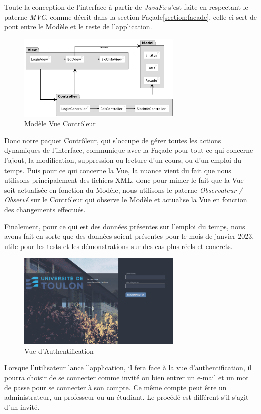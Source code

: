 \documentclass[a4paper,french,final]{memoir}
\begin{document}
Toute la conception de l'interface à partir de \emph{JavaFx} s'est faite en respectant le paterne \emph{MVC}, comme décrit dans la section Façade\ref{section:facade}, celle-ci sert de pont entre le Modèle et le reste de l'application.
\begin{figure}[!h]
    \centering
    \includegraphics[width=0.7\textwidth]{figures/mvc_pattern.png}
    \caption{Modèle Vue Contrôleur}
    \label{fig:mvc_pattern}
\end{figure}
Donc notre paquet Contrôleur, qui s'occupe de gérer toutes les actions dynamiques de l'interface, communique avec la Façade pour tout ce qui concerne l'ajout, la modification, suppression ou lecture d'un cours, ou d'un emploi du temps.
Puis pour ce qui concerne la Vue, la nuance vient du fait que nous utilisons principalement des fichiers XML, donc pour mimer le fait que la Vue soit actualisée en fonction du Modèle, nous utilisons le paterne \emph{Observateur / Observé} sur le Contrôleur qui observe le Modèle et actualise la Vue en fonction des changements effectués.

Finalement, pour ce qui est des données présentes sur l'emploi du temps, nous avons fait en sorte que des données soient présentes pour le mois de janvier 2023, utile pour les tests et les démonstrations sur des cas plus réels et concrets.

\begin{figure}[!h]
    \centering
    \includegraphics[width=0.7\textwidth]{figures/login_view.png}
    \caption{Vue d'Authentification}
    \label{fig:login_view}
\end{figure}
Lorsque l'utilisateur lance l'application, il fera face à la vue d'authentification, il pourra choisir de se connecter comme invité ou bien entrer un e-mail et un mot de passe pour se connecter à son compte. Ce même compte peut être un administrateur, un professeur ou un étudiant. Le procédé est différent s'il s'agit d'un invité.
\end{document}
